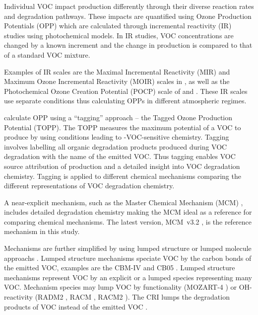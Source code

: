 Individual VOC impact  production differently through their diverse reaction rates and degradation pathways. 
These impacts are quantified using Ozone Production Potentials (OPP) which are calculated through incremental reactivity (IR) studies using photochemical models. 
In IR studies, VOC concentrations are changed by a known increment and the change in  production is compared to that of a standard VOC mixture. 

Examples of IR scales are the Maximal Incremental Reactivity (MIR) and Maximum Ozone Incremental Reactivity (MOIR) scales in \citet{Carter:1994}, as well as the Photochemical Ozone Creation Potential (POCP) scale of \citet{Derwent:1996} and \citet{Derwent:1998}. 
These IR scales use separate  conditions thus calculating OPPs in different atmospheric regimes.

\citet{Butler:2011} calculate OPP using a ``tagging'' approach -- the Tagged Ozone Production Potential (TOPP). 
The TOPP measures the maximum potential of a VOC to produce  by using  conditions leading to -VOC-sensitive chemistry.
Tagging involves labelling all organic degradation products produced during VOC degradation with the name of the emitted VOC.
Thus tagging enables VOC source attribution of  production and a detailed insight into VOC degradation chemistry.
Tagging is applied to different chemical mechanisms comparing the different representations of VOC degradation chemistry. 

A near-explicit mechanism, such as the Master Chemical Mechanism (MCM) \citep{Jenkin:2003, Saunders:2003, Bloss:2005}, includes detailed degradation chemistry making the MCM ideal as a reference for comparing chemical mechanisms.
The latest version, \mbox{MCM v3.2} \citep{MCM_Site}, is the reference mechanism in this study.

Mechanisms are further simplified by using lumped structure or lumped molecule approachs \citep{Dodge:2000}. 
Lumped structure mechanisms speciate VOC by the carbon bonds of the emitted VOC, examples are the CBM-IV \citep{Gery:1989} and CB05 \citep{Yarwood:2005}.
Lumped structure mechanisms represent VOC by an explicit or a lumped species representing many VOC. 
Mechanism species may lump VOC by functionality (MOZART-4 \citep{Emmons:2010}) or OH-reactivity (RADM2 \citep{Stockwell:1990}, RACM \citep{Stockwell:1997}, RACM2 \citep{Goliff:2013}).
The CRI lumps the degradation products of VOC instead of the emitted VOC \citep{Jenkin:2008}.

